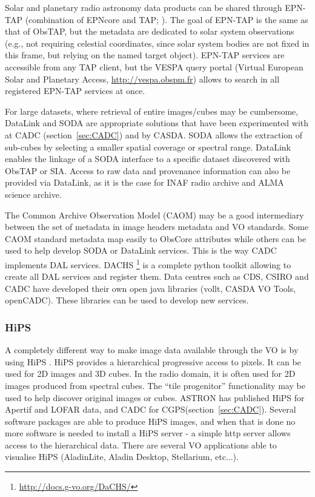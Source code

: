 \documentclass[11pt,a4paper]{ivoa}
\begin{document}
Solar and planetary radio astronomy data products can be shared through EPN-TAP (combination of EPNcore and TAP; \cite{std:EPNTAP}). The goal of EPN-TAP is the same as that of ObsTAP, but the metadata are dedicated to solar system observations (e.g., not requiring celestial coordinates, since solar system bodies are not fixed in this frame, but relying on the named target object). EPN-TAP services are accessible from any TAP client, but the VESPA query portal (Virtual European Solar and Planetary Access, \url{http://vespa.obspm.fr}) allows to search in all registered EPN-TAP services at once.

For large datasets, where retrieval of entire images/cubes may be cumbersome,  DataLink and SODA are appropriate solutions that have been experimented with at CADC (section~\ref{sec:CADC}) and by CASDA. SODA allows the extraction of sub-cubes by selecting a smaller spatial coverage or spectral range. DataLink enables the linkage of a SODA interface to a specific dataset discovered with ObsTAP or SIA. Access to raw data and provenance information can also be provided via DataLink, as it is the case for INAF radio archive and ALMA science archive.

The Common Archive Observation Model (CAOM) may be a good intermediary between the set of metadata in image headers metadata and VO standards. Some CAOM standard metadata map easily to ObsCore attributes while others can be used to help develop SODA or DataLink services. This is the way CADC implements DAL services. DACHS \footnote{\url{http://docs.g-vo.org/DaCHS/}} is a complete python toolkit allowing to create all DAL services and register them. Data centres such as CDS, CSIRO and CADC have developed their own open java libraries (vollt, CASDA VO Tools, openCADC). These libraries can be used to develop new services.


\subsubsection{HiPS}
A completely different way to make image data available through the VO is by using HiPS \citep{2017ivoa.spec.0519F}. HiPS provides a hierarchical progressive access to pixels. It can be used for 2D images and 3D cubes. In the radio domain, it is often used for 2D images produced from spectral cubes. The ``tile progenitor''  functionality may be used to help discover original images or cubes. ASTRON has published HiPS for Apertif and LOFAR data, and CADC for CGPS(section~\ref{sec:CADC}). Several software packages are able to produce HiPS images, and when that is done no more software is needed to install a HiPS server - a simple http server allows access to the hierarchical data. There are several VO applications able to visualise HiPS (AladinLite, Aladin Desktop, Stellarium, etc...). 
\end{document}
